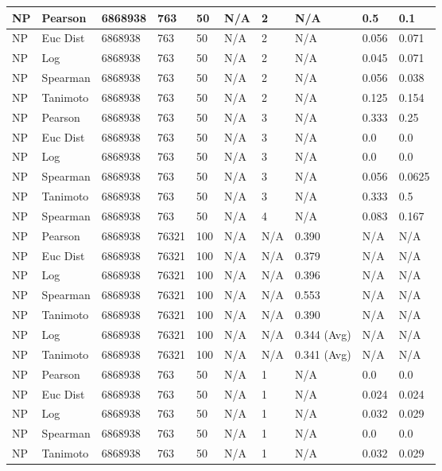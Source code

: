 \documentclass{article}
\begin{document}
\begin{longtable}{ |p{1.7cm}|p{1.9cm}|p{1.5cm}|p{1.5cm}|p{0.75cm}|p{0.75cm}|p{0.75cm}|p{0.75cm}|p{1.5cm}|p{1.5cm}|}
    NP & Pearson & 6868938 & 763 & 50 &  N/A & 2 & N/A & 0.5 & 0.1  \\ \hline
    NP & Euc Dist & 6868938 & 763 & 50 & N/A &  2 & N/A &0.056 & 0.071   \\ \hline
    NP & Log & 6868938 & 763 & 50 &  N/A &  2 & N/A & 0.045 & 0.071 \\ \hline
    NP & Spearman & 6868938 & 763 & 50 & N/A &  2 & N/A & 0.056 & 0.038 \\ \hline
    NP & Tanimoto & 6868938 & 763 & 50 & N/A &  2 & N/A & 0.125 & 0.154 \\ \hline
    
    NP & Pearson & 6868938 & 763 & 50&  N/A & 3 & N/A & 0.333 & 0.25  \\ \hline
    NP & Euc Dist & 6868938 & 763 & 50 & N/A & 3  & N/A &0.0 & 0.0   \\ \hline
    NP & Log & 6868938 & 763 & 50 &  N/A & 3  & N/A & 0.0 & 0.0  \\ \hline
    NP & Spearman & 6868938 & 763 & 50 & N/A & 3  & N/A &0.056 & 0.0625 \\ \hline
    NP & Tanimoto & 6868938 & 763 & 50 & N/A & 3 & N/A & 0.333 & 0.5 \\ \hline
    NP & Spearman & 6868938 & 763 & 50 & N/A &  4 & N/A & 0.083 & 0.167 \\ \hline
    
    NP & Pearson & 6868938 & 76321 & 100 &  N/A & N/A & 0.390 & N/A & N/A  \\ \hline
    NP & Euc Dist & 6868938 & 76321 & 100 & N/A & N/A & 0.379 & N/A & N/A   \\ \hline
    NP & Log & 6868938 & 76321 & 100 &  N/A & N/A & 0.396 & N/A & N/A  \\ \hline
    NP & Spearman & 6868938 & 76321 & 100 & N/A & N/A & 0.553 & N/A & N/A \\ \hline
    NP & Tanimoto & 6868938 & 76321 & 100 & N/A & N/A & 0.390 & N/A & N/A \\ \hline
    NP & Log & 6868938 & 76321 & 100 & N/A & N/A & 0.344 (Avg) & N/A & N/A \\ \hline
    NP & Tanimoto & 6868938 & 76321 & 100 & N/A & N/A & 0.341 (Avg) & N/A & N/A \\ \hline
    
    NP & Pearson & 6868938 & 763 & 50 &  N/A & 1 & N/A & 0.0 & 0.0  \\ \hline
    NP & Euc Dist & 6868938 & 763 & 50 & N/A & 1 & N/A &0.024 & 0.024   \\ \hline
    NP & Log & 6868938 & 763 & 50 &  N/A & 1 & N/A & 0.032 & 0.029  \\ \hline
    NP & Spearman & 6868938 & 763 & 50 & N/A & 1 & N/A &0.0 & 0.0 \\ \hline
    NP & Tanimoto & 6868938 & 763 & 50 & N/A & 1 & N/A & 0.032 & 0.029 \\ \hline
    

\end{longtable}
\end{document}
